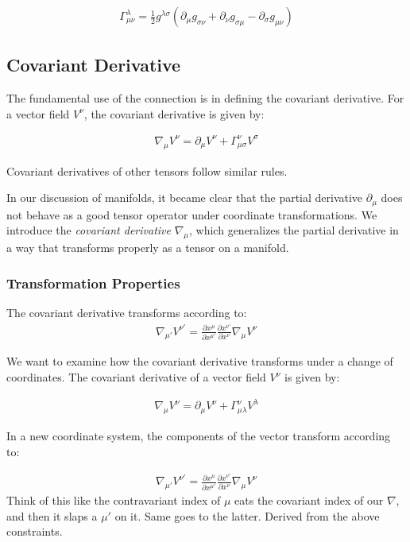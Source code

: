 \documentclass[12pt]{book}
\begin{document}
\begin{align}
\Gamma^\lambda_{\mu\nu} = \frac{1}{2}g^{\lambda\sigma}\left( \partial_\mu g_{\sigma\nu} + \partial_\nu g_{\sigma\mu} - \partial_\sigma g_{\mu\nu} \right)
\end{align}

\subsection{Covariant Derivative}
The fundamental use of the connection is in defining the covariant derivative. For a vector field \(V^\nu\), the covariant derivative is given by:

\begin{align}
\nabla_\mu V^\nu = \partial_\mu V^\nu + \Gamma^\nu_{\mu\sigma} V^\sigma
\end{align}

Covariant derivatives of other tensors follow similar rules. 

In our discussion of manifolds, it became clear that the partial derivative \(\partial_\mu\) does not behave as a good tensor operator under coordinate transformations. We introduce the \emph{covariant derivative} \(\nabla_\mu\), which generalizes the partial derivative in a way that transforms properly as a tensor on a manifold.

\subsubsection{Transformation Properties}
The covariant derivative transforms according to:
\begin{align}
\nabla_{\mu'} V^{\nu'} = \frac{\partial x^\mu}{\partial x^{\mu'}} \frac{\partial x^{\nu'}}{\partial x^\nu} \nabla_\mu V^\nu
\end{align}

We want to examine how the covariant derivative transforms under a change of coordinates. The covariant derivative of a vector field \( V^\nu \) is given by:

\begin{align}
\nabla_\mu V^\nu = \partial_\mu V^\nu + \Gamma^\nu_{\mu\lambda} V^\lambda
\end{align}

In a new coordinate system, the components of the vector transform according to:

\begin{align}
\nabla_{\mu'} V^{\nu'} = \frac{\partial x^\mu}{\partial x^{\mu'}} \frac{\partial x^{\nu'}}{\partial x^\nu} \nabla_\mu V^\nu
\end{align}
Think of this like the contravariant index of $\mu$ eats the covariant index of our $\nabla$, and then it slaps a $\mu'$ on it. Same goes to the latter. Derived from the above constraints. 
\end{document}
